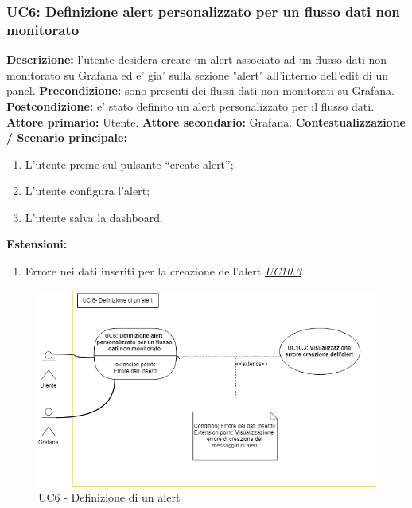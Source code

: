                 \subsubsection{UC6: Definizione alert personalizzato per un flusso dati non monitorato}
                    \textbf{Descrizione:} l’utente desidera creare un alert associato ad un flusso dati non monitorato su Grafana ed e’ gia’ sulla sezione "alert" all'interno dell'edit di un panel.
                    \newline
                    \textbf{Precondizione:} sono presenti dei flussi dati non monitorati su Grafana.
                    \newline
                    \textbf{Postcondizione:} e’ stato definito un alert personalizzato per il flusso dati.
                    \newline
                    \textbf{Attore primario:} Utente.
                    \newline
                    \textbf{Attore secondario:} Grafana.
                    \newline
                    \textbf{Contestualizzazione / Scenario principale:} \begin{enumerate}
                            \item L’utente preme sul pulsante “create alert”;
                            \item L’utente configura l’alert;
                            \item L’utente salva la dashboard.
                        \end{enumerate}
                    
                    \textbf{Estensioni:} 
                    \begin{enumerate}
                            \item Errore nei dati inseriti per la creazione dell'alert \underline{\textit{UC10.3}}.
                        \end{enumerate}
                
                		\begin{figure}[!htbp]
		                	\centering
		                	\includegraphics[width=\textwidth]{UC6.png}
		                	\caption{UC6 - Definizione di un alert}
		                \end{figure}
	                	\clearpage
                
